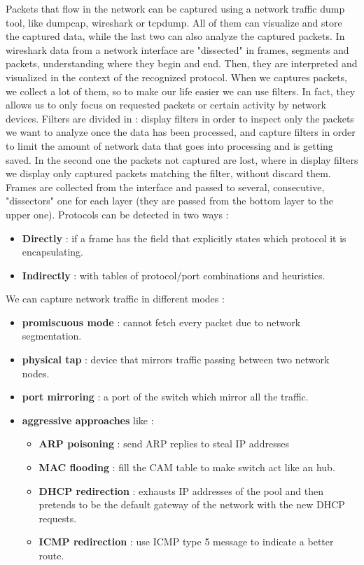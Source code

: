 \documentclass[11pt]{article}
\begin{document}
Packets that flow in the network can be captured using a network traffic dump tool, like dumpcap, wireshark or tcpdump. All of them can visualize and store the captured data, while the last two can also analyze the captured packets. In wireshark data from a network interface are "dissected" in frames, segments and packets, understanding where they begin and end. Then, they are interpreted and visualized in the context of the recognized protocol. When we captures packets, we collect a lot of them, so to make our life easier we can use filters. In fact, they allows us to only focus on requested packets or certain activity by network devices. Filters are divided in : display filters in order to inspect only the packets we want to analyze once the data has been processed, and capture filters in order to limit the amount of network data that goes into processing and is getting saved. In the second one the packets not captured are lost, where in display filters we display only captured packets matching the filter, without discard them. Frames are collected from the interface and passed to several, consecutive, "dissectors" one for each layer (they are passed from the bottom layer to the upper one). Protocols can be detected in two ways :
\begin{itemize}
\item \textbf{Directly} : if a frame has the field that explicitly states which protocol it is encapsulating.
\item \textbf{Indirectly} : with tables of protocol/port combinations and heuristics. 
\end{itemize} 
We can capture network traffic in different modes :
\begin{itemize}
\item \textbf{promiscuous mode} : cannot fetch every packet due to network segmentation.
\item \textbf{physical tap} : device that mirrors traffic passing between two network nodes.
\item \textbf{port mirroring} : a port of the switch which mirror all the traffic.
\item \textbf{aggressive approaches} like :
\begin{itemize}
\item \textbf{ARP poisoning} : send ARP replies to steal IP addresses
\item \textbf{MAC flooding} : fill the CAM table to make switch act like an hub.
\item \textbf{DHCP redirection} : exhausts IP addresses of the pool and then pretends to be the default gateway of the network with the new DHCP requests.
\item \textbf{ICMP redirection} : use ICMP type 5 message to indicate a better route.
\end{itemize}
\end{itemize}
\end{document}
